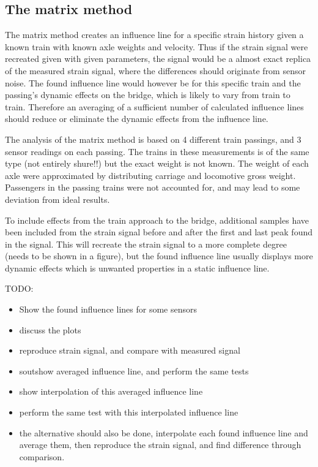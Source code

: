\subsection{The matrix method}
The matrix method creates an influence line for a specific strain history given a known train with known axle weights and velocity. Thus if the strain signal were recreated given with given parameters, the signal would be a almost exact replica of the measured strain signal, where the differences should originate from sensor noise. The found influence line would however be for this specific train and the passing's dynamic effects on the bridge, which is likely to vary from train to train. Therefore an averaging of a sufficient number of calculated influence lines should reduce or eliminate the dynamic effects from the influence line.

The analysis of the matrix method is based on 4 different train passings, and 3 sensor readings on each passing. The trains in these measurements is of the same type (not entirely shure!!) but the exact weight is not known. The weight of each axle were approximated by distributing carriage and locomotive gross weight. Passengers in the passing trains were not accounted for, and may lead to some deviation from ideal results.

To include effects from the train approach to the bridge, additional samples have been included from the strain signal before and after the first and last peak found in the signal. This will recreate the strain signal to a more complete degree (needs to be shown in a figure), but the found influence line usually displays more dynamic effects which is unwanted properties in a static influence line.

TODO:
\begin{itemize}
\item Show the found influence lines for some sensors
\item discuss the plots
\item reproduce strain signal, and compare with measured signal
\item sout{show averaged influence line}, and perform the same tests
\item show interpolation of this averaged influence line
\item perform the same test with this interpolated influence line
\item the alternative should also be done, interpolate each found influence line and average them, then reproduce the strain signal, and find difference through comparison.
\end{itemize}


